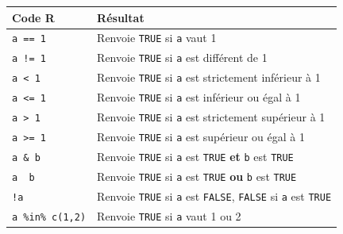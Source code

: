 \documentclass[12pt,twosided, notitlepage]{book}
\begin{document}
\begin{longtable}[]{@{}ll@{}}
\toprule
\textbf{Code R} & \textbf{Résultat}\tabularnewline
\midrule
\endhead
\texttt{a\ ==\ 1}\index{\texttt{==}|textbf} & Renvoie \texttt{TRUE} si
\texttt{a} vaut 1\tabularnewline
\texttt{a\ !=\ 1}\index{\texttt{"!=}|textbf} & Renvoie \texttt{TRUE} si
\texttt{a} est différent de 1\tabularnewline
\texttt{a\ \textless{}\ 1}\index{\texttt{<}|textbf} & Renvoie
\texttt{TRUE} si \texttt{a} est strictement inférieur à 1\tabularnewline
\texttt{a\ \textless{}=\ 1}\index{\texttt{<=}|textbf} & Renvoie
\texttt{TRUE} si \texttt{a} est inférieur ou égal à 1\tabularnewline
\texttt{a\ \textgreater{}\ 1}\index{\texttt{>}|textbf} & Renvoie
\texttt{TRUE} si \texttt{a} est strictement supérieur à 1\tabularnewline
\texttt{a\ \textgreater{}=\ 1}\index{\texttt{>=}|textbf} & Renvoie
\texttt{TRUE} si \texttt{a} est supérieur ou égal à 1\tabularnewline
\texttt{a\ \&\ b}\index{\texttt{\&}|textbf} & Renvoie \texttt{TRUE} si
\texttt{a} est \texttt{TRUE} \textbf{et} \texttt{b} est
\texttt{TRUE}\tabularnewline
\texttt{a\ \textbar{}\ b}\index{\texttt{"|}|textbf} & Renvoie
\texttt{TRUE} si \texttt{a} est \texttt{TRUE} \textbf{ou} \texttt{b} est
\texttt{TRUE}\tabularnewline
\texttt{!a}\index{\texttt{"!}|textbf} & Renvoie \texttt{TRUE} si
\texttt{a} est \texttt{FALSE}, \texttt{FALSE} si \texttt{a} est
\texttt{TRUE}\tabularnewline
\texttt{a\ \%in\%\ c(1,2)}\index{\texttt{\%in\%}|textbf} & Renvoie
\texttt{TRUE} si \texttt{a} vaut 1 ou 2\tabularnewline
\bottomrule
\end{longtable}
\end{document}
